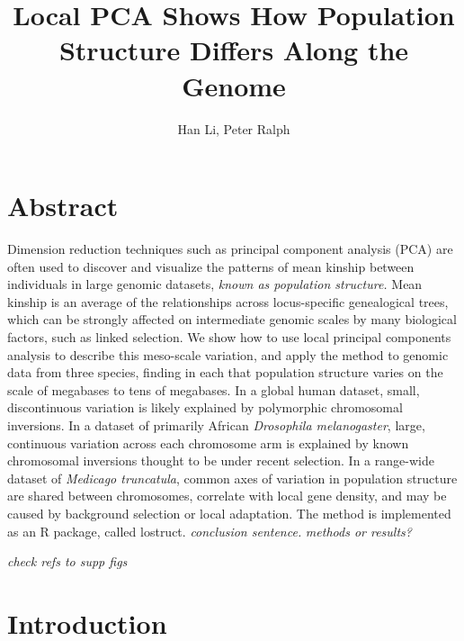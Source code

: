 \documentclass[11pt, oneside]{article}   	%
\title{Local PCA Shows How Population Structure Differs Along the Genome}
\author{Han Li, Peter Ralph}
\newcommand{\plr}[1]{{\em \color{blue} #1}}
\begin{document}
\maketitle
\doublespacing


\section*{Abstract}

Dimension reduction techniques such as principal component analysis (PCA)
are often used to discover and visualize the patterns 
of mean kinship between individuals in large genomic datasets,
\plr{known as population structure.}
Mean kinship
is an average of the relationships across locus-specific genealogical trees,
which can be strongly affected on intermediate genomic scales by many biological factors,
such as linked selection.
We show how to use local principal components analysis to describe this meso-scale variation,
and apply the method to genomic data from three species,
finding in each that population structure varies on the scale of megabases to tens of megabases.
In a global human dataset, small, discontinuous variation is likely explained by polymorphic chromosomal inversions.
In a dataset of primarily African \textit{Drosophila melanogaster}, large, continuous variation across each chromosome arm
is explained by known chromosomal inversions thought to be under recent selection.
In a range-wide dataset of \textit{Medicago truncatula},
common axes of variation in population structure are shared between chromosomes,
correlate with local gene density,
and may be caused by background selection or local adaptation.
The method is implemented as an R package, called lostruct.
\plr{conclusion sentence.}
\plr{methods or results?}

\plr{check refs to supp figs}


\section{Introduction}
\end{document}
